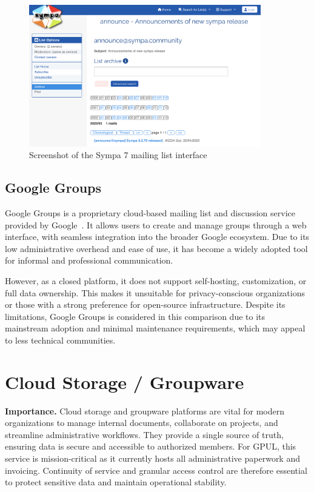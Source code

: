 \begin{figure}[H]
  \centering
  \includegraphics[width=0.9\textwidth]{imaxes/sympa.png}
  \caption{Screenshot of the Sympa 7 mailing list interface}
  \label{fig:sympa}
\end{figure}

\subsection*{Google Groups}

Google Groups is a proprietary cloud-based mailing list and discussion service provided by Google~\cite{google-groups-docs}. It allows users to create and manage groups through a web interface, with seamless integration into the broader Google ecosystem. Due to its low administrative overhead and ease of use, it has become a widely adopted tool for informal and professional communication.

However, as a closed platform, it does not support self-hosting, customization, or full data ownership. This makes it unsuitable for privacy-conscious organizations or those with a strong preference for open-source infrastructure. Despite its limitations, Google Groups is considered in this comparison due to its mainstream adoption and minimal maintenance requirements, which may appeal to less technical communities.

\section{Cloud Storage / Groupware}

\textbf{Importance.} Cloud storage and groupware platforms are vital for modern organizations to manage internal documents, collaborate on projects, and streamline administrative workflows. They provide a single source of truth, ensuring data is secure and accessible to authorized members. For GPUL, this service is mission-critical as it currently hosts all administrative paperwork and invoicing. Continuity of service and granular access control are therefore essential to protect sensitive data and maintain operational stability.

